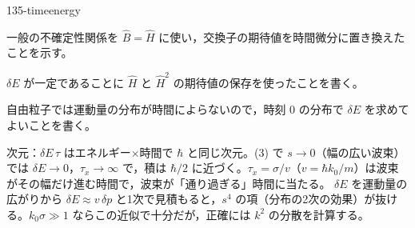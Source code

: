 \documentclass[uplatex,dvipdfmx,a4paper,11pt]{jsarticle}
\begin{document}
\begin{kaisetsu}{135-timeenergy}
\begin{ronten}
  \item {} 一般の不確定性関係を $\hat{B}=\hat{H}$ に使い，交換子の期待値を時間微分に置き換えたことを示す。
  \item {} $\delta E$ が一定であることに $\hat{H}$ と $\hat{H}^{2}$ の期待値の保存を使ったことを書く。
  \item {} 自由粒子では運動量の分布が時間によらないので，時刻 $0$ の分布で $\delta E$ を求めてよいことを書く。
\end{ronten}
\kenzan 次元：$\delta E\,\tau$ はエネルギー×時間で $\hbar$ と同じ次元。(3) で $s\to0$（幅の広い波束）では $\delta E\to0$，$\tau_{x}\to\infty$ で，積は $\hbar/2$ に近づく。$\tau_{x}=\sigma/v$（$v=\hbar k_{0}/m$）は波束がその幅だけ進む時間で，波束が「通り過ぎる」時間に当たる。
\tsumazuki $\delta E$ を運動量の広がりから $\delta E\approx v\,\delta p$ と1次で見積もると，$s^{4}$ の項（分布の2次の効果）が抜ける。$k_{0}\sigma\gg1$ ならこの近似で十分だが，正確には $k^{2}$ の分散を計算する。
\end{kaisetsu}
\end{document}
